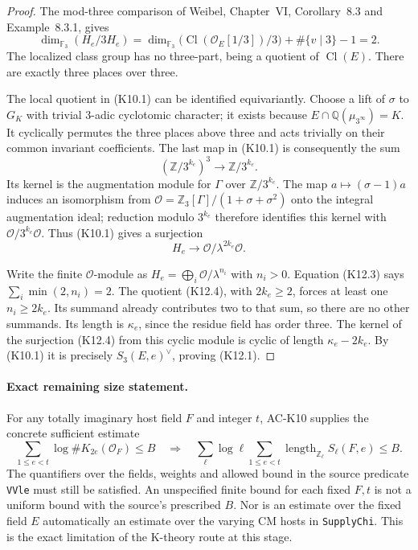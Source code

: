 \begin{proof}
The mod-three comparison of Weibel, Chapter~VI, Corollary~8.3
and Example~8.3.1, gives
\[
 \dim_{\mathbb F_3}(H_e/3H_e)
 =\dim_{\mathbb F_3}\bigl(\operatorname{Cl}
                         (\mathcal O_E[1/3])/3\bigr)
            +\#\{v\mid3\}-1=2.                       \tag{K12.3}
\]
The localized class group has no three-part, being a quotient
of $\operatorname{Cl}(E)$.  There are exactly three places
over three.

The local quotient in (K10.1) can be identified equivariantly.
Choose a lift of $\sigma$ to $G_K$ with trivial $3$-adic
cyclotomic character; it exists because
$E\cap\mathbb Q(\mu_{3^\infty})=K$.
It cyclically permutes the three places above three and acts
trivially on their common invariant coefficients.  The last
map in (K10.1) is consequently the sum
\[
 (\mathbb Z/3^{k_e})^3\longrightarrow\mathbb Z/3^{k_e}.
\]
Its kernel is the augmentation module for $\Gamma$ over
$\mathbb Z/3^{k_e}$.  The map $a\mapsto(\sigma-1)a$ induces
an isomorphism from $\mathcal O=\mathbb Z_3[\Gamma]/(1+\sigma+\sigma^2)$
onto the integral augmentation ideal; reduction modulo $3^{k_e}$ therefore
identifies this kernel with $\mathcal O/3^{k_e}\mathcal O$.
Thus (K10.1) gives a surjection
\[
              H_e\longrightarrow
                 \mathcal O/\lambda^{2k_e}\mathcal O.  \tag{K12.4}
\]

Write the finite $\mathcal O$-module as
$H_e=\bigoplus_i\mathcal O/\lambda^{n_i}$ with $n_i>0$.
Equation (K12.3) says $\sum_i\min(2,n_i)=2$.
The quotient (K12.4), with $2k_e\geq2$, forces at least
one $n_i\geq2k_e$.  Its summand already contributes two
to that sum, so there are no other summands.
Its length is $\kappa_e$, since the residue field has order
three.  The kernel of the surjection (K12.4) from this
cyclic module is cyclic of length $\kappa_e-2k_e$.
By (K10.1) it is precisely $S_3(E,e)^\vee$, proving (K12.1).
\end{proof}

\paragraph{Exact remaining size statement.}
For any totally imaginary host field $F$ and integer $t$, AC-K10
supplies the concrete sufficient estimate
\[
 \sum_{1\leq e<t}\log\#K_{2e}(\mathcal O_F)\leq B
 \quad\Longrightarrow\quad
 \sum_\ell\log\ell\sum_{1\leq e<t}
       \operatorname{length}_{\mathbb Z_\ell}S_\ell(F,e)
       \leq B.                                        \tag{K11.4}
\]
The quantifiers over the fields, weights and allowed bound in
the source predicate \texttt{VVle} must still be satisfied.
An unspecified finite bound for each fixed $F,t$ is not a
uniform bound with the source's prescribed $B$.
Nor is an estimate over the fixed field $E$ automatically an
estimate over the varying CM hosts in \texttt{SupplyChi}.
This is the exact limitation of the K-theory route at this stage.

